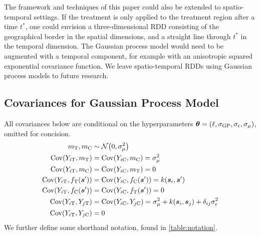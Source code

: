 \documentclass[12pt]{article}
\begin{document}
The framework and techniques of this paper could also be extended to spatio-temporal settings.
If the treatment is only applied to the treatment region after a time \(t^*\), one could envision a three-dimensional RDD consisting of the geographical border in the spatial dimensions, and a straight line through \(t^*\) in the temporal dimension.
The Gaussian process model would need to be augmented with a temporal component, for example with an anisotropic squared exponential covariance function.
We leave spatio-temporal RDDs using Gaussian process models to future research.





\begin{appendices}

\section{Covariances for Gaussian Process Model}
\label{sec:covariances}
All covariances below are conditional on the hyperparameters \(\bm{\theta} = \left\lparen\ell,\sigma_{\mathrm{GP}}, \sigma_{\epsilon}, \sigma_{\mu}\right\rparen\), omitted for concision.
\begin{equation}
    \begin{split}
        m_\treat, m_\ctrol   &\sim \normal\del{0,\sigmamu^2} \\
        \cov(Y_{i\treat},m_\treat)  &= \cov(Y_{i\ctrol},m_\ctrol) = \sigmamu^2 \\
        \cov(Y_{i\treat},m_\ctrol)  &= \cov(Y_{i\ctrol},m_\treat)  = 0 \\
        \cov\del{Y_{i\treat}, f_{\treat}(\svec')} &= \cov\del{Y_{i\ctrol}, f_{\ctrol}(\svec')} = k(\svec_i,\svec') \\
        \cov\del{Y_{i\treat}, f_{\ctrol}(\svec')} &= \cov\del{Y_{i\ctrol}, f_{\treat}(\svec')} = 0 \\
        \cov(Y_{i\treat},Y_{j\treat}) &= \cov(Y_{i\ctrol},Y_{j\ctrol}) = \sigmamu^2 + k(\svec_i,\svec_j) + \delta_{ij}\sigman^2 \\
        \cov(Y_{i\treat},Y_{j\ctrol}) &= 0
    \end{split}
    \label{eq:covariances}
\end{equation}
We further define some shorthand notation, found in \autoref{table:notation}.


\end{appendices}
\end{document}
